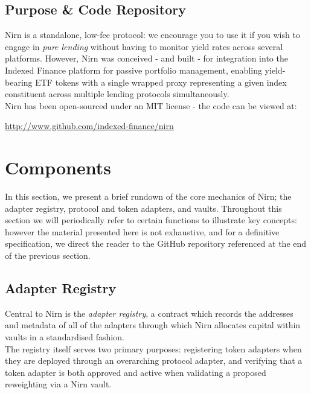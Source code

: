 \documentclass{article}
\begin{document}
\subsection{Purpose \& Code Repository}

Nirn is a standalone, low-fee protocol: we encourage you to use it if you wish to engage in \textit{pure lending} without having to monitor yield rates across several platforms. However, Nirn was conceived - and built - for integration into the Indexed Finance platform for passive portfolio management, enabling yield-bearing ETF tokens with a single wrapped proxy representing a given index constituent across multiple lending protocols simultaneously.\\

\noindent
Nirn has been open-sourced under an MIT license - the code can be viewed at:

\begin{center}
    \url{http://www.github.com/indexed-finance/nirn}
\end{center}

\newpage
\section{Components}

In this section, we present a brief rundown of the core mechanics of Nirn; the adapter registry, protocol and token adapters, and vaults. Throughout this section we will periodically refer to certain functions to illustrate key concepts: however the material presented here is not exhaustive, and for a definitive specification, we direct the reader to the GitHub repository referenced at the end of the previous section.

\subsection{Adapter Registry}

Central to Nirn is the \textit{adapter registry}, a contract which records the addresses and metadata of all of the adapters through which Nirn allocates capital within vaults in a standardised fashion.\\

\noindent
The registry itself serves two primary purposes: registering token adapters when they are deployed through an overarching protocol adapter, and verifying that a token adapter is both approved and active when validating a proposed reweighting via a Nirn vault.
\end{document}
